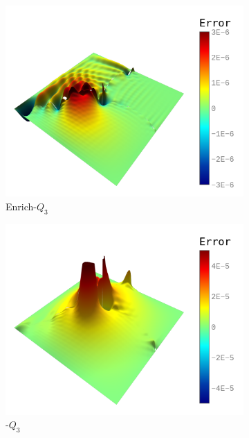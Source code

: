 \begin{figure}[ht]
	\center
	\captionsetup[subfigure]{labelformat=empty}
	\begin{subfigure}[t]{.45\linewidth}
		\center
		\includegraphics[scale=.4]{three_patch_plate_op_contour}
		\caption{Enrich-$Q_3$}
	\end{subfigure}
	\begin{subfigure}[t]{.45\linewidth}
		\center
		\includegraphics[scale=.4]{three_patch_plate_Bezier_contour}
		\caption{\Bezier-$Q_3$}
	\end{subfigure}\\
	\center
	\begin{subfigure}[t]{.45\linewidth}

\end{subfigure}
\end{figure}
